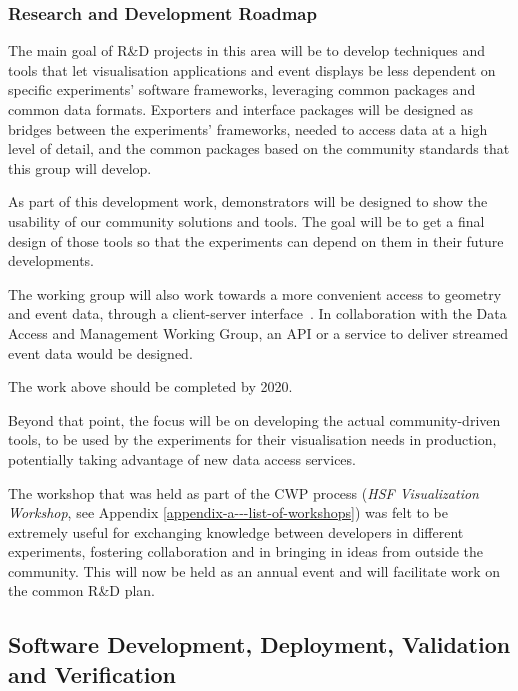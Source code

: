 \subsubsection*{Research and Development Roadmap}

The main goal of R\&D projects in this area will be to develop
techniques and tools that let visualisation applications and event
displays be less dependent on specific experiments' software frameworks,
leveraging common packages and common data formats. Exporters and
interface packages will be designed as bridges between the experiments'
frameworks, needed to access data at a high level of detail, and the
common packages based on the community standards that this group will
develop.

As part of this development work, demonstrators will be designed to show
the usability of our community solutions and tools. The goal will be to
get a final design of those tools so that the experiments can depend on
them in their future developments.

The working group will also work towards a more convenient access to geometry and
event data, through a client-server interface~\cite{1742-6596-898-7-072015}. In collaboration with the
Data Access and Management Working Group, an API or a service to deliver streamed
event data would be designed.

The work above should be completed by 2020.

Beyond that point, the focus will be on developing the actual
community-driven tools, to be used by the experiments for their
visualisation needs in production, potentially taking advantage of new
data access services.

The workshop that was held as part of the CWP process
(\emph{HSF Visualization Workshop}, see Appendix \ref{appendix-a---list-of-workshops})
was felt to be
extremely useful for exchanging knowledge between developers in
different experiments, fostering collaboration and in bringing in ideas
from outside the community. This will now be held as an annual event and
will facilitate work on the common R\&D plan.

\hypertarget{software-development-deployment-validation-and-verification}{%
\subsection{Software Development, Deployment, Validation and
Verification}\label{software-development-deployment-validation-and-verification}}

